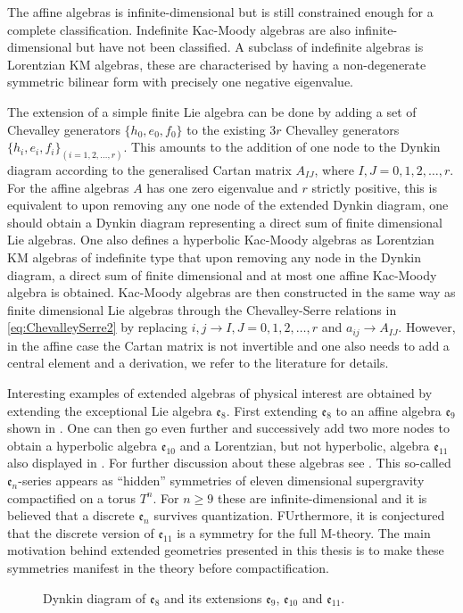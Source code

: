 The affine algebras is infinite-dimensional but is still constrained enough for a complete classification. Indefinite Kac-Moody algebras are also infinite-dimensional but have not been classified. A subclass of indefinite algebras is Lorentzian KM algebras, these are characterised by having a non-degenerate symmetric bilinear form with precisely one negative eigenvalue. 

The extension of a simple finite Lie algebra can be done by adding a set of Chevalley generators $\{h_0,e_0,f_0\}$ to the existing $3r$ Chevalley generators $\{h_i,e_i,f_i\}_{(i=1,2,\ldots,r)}$. This amounts to the addition of one node to the Dynkin diagram according to the generalised Cartan matrix $A_{IJ}$, where $I,J=0,1,2,\ldots, r$. For the affine algebras $A$ has one zero eigenvalue and $r$ strictly positive, this is equivalent to upon removing any one node of the extended Dynkin diagram, one should obtain a Dynkin diagram representing a direct sum of finite dimensional Lie algebras. One also defines a hyperbolic Kac-Moody algebras as Lorentzian KM algebras of indefinite type that upon removing any node in the Dynkin diagram, a direct sum of finite dimensional and at most one affine Kac-Moody algebra is obtained. Kac-Moody algebras are then constructed in the same way as finite dimensional Lie algebras through the Chevalley-Serre relations in \eqref{eq:ChevalleySerre2} by replacing $i,j\to I,J=0,1,2,\ldots,r$ and $a_{ij}\to A_{IJ}$. However, in the affine case the Cartan matrix is not invertible and one also needs to add a central element and a derivation, we refer to the literature for details. 

Interesting examples of extended algebras of physical interest are obtained by extending the exceptional Lie algebra $\mathfrak{e}_8$. First extending $\mathfrak{e}_8$ to an affine algebra $\mathfrak{e}_9$ shown in . One can then go even further and successively add two more nodes to obtain a hyperbolic algebra $\mathfrak{e}_{10}$ and a Lorentzian, but not hyperbolic, algebra $\mathfrak{e}_{11}$ also displayed in . For further discussion about these algebras see \cite{PhdJakob2009,PhdDaniel2010}. This so-called $\mathfrak{e}_n$-series appears as ``hidden'' symmetries of eleven dimensional supergravity compactified on a torus $T^n$. For $n\geq 9$ these are infinite-dimensional and it is believed that a discrete $\mathfrak{e}_n$ survives quantization. FUrthermore, it is conjectured \cite{West2011} that the discrete version of $\mathfrak{e}_{11}$ is a symmetry for the full M-theory. The main motivation behind extended geometries presented in this thesis is to make these symmetries manifest in the theory before compactification. 
\begin{figure}
    \caption{Dynkin diagram of $\mathfrak{e}_8$ and its extensions $\mathfrak{e}_9$, $\mathfrak{e}_{10}$ and $\mathfrak{e}_{11}$.}
    \label{fig:DynkinEseries}
\end{figure}

